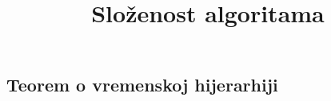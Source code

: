 \documentclass[12pt]{rectors}
\title{Složenost algoritama}
\newtheorem{definition}{Definicija}[section]
\begin{document}
\begin{otherlanguage}{croatian}




\section{Teorem o vremenskoj hijerarhiji}




\end{otherlanguage}
\end{document}
